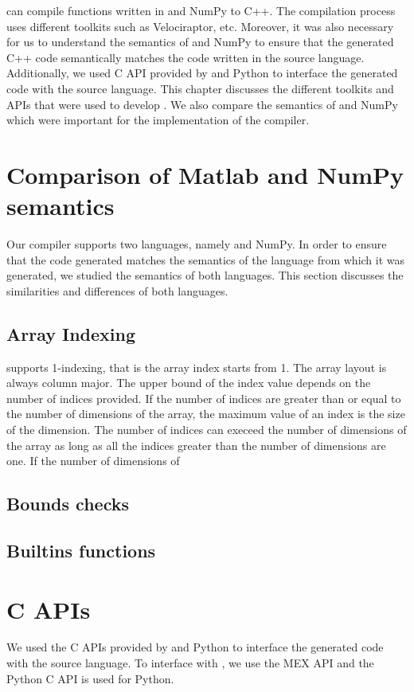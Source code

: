 \velocty can compile functions written in \matlab and NumPy to C++. The compilation process uses different toolkits such as Velociraptor, \mclab etc. Moreover, it was also necessary for us to understand the semantics of \matlab and NumPy to ensure that the generated C++ code semantically matches the code written in the source language. Additionally, we used C API provided by \matlab and Python to interface the generated code with the source language. This chapter discusses the different toolkits and APIs that were used to develop \velocty. We also compare the semantics of \matlab and NumPy which were important for the implementation of the compiler. 
\section{Comparison of Matlab and NumPy semantics}
Our compiler supports two languages, namely \matlab and NumPy. In order to ensure that the code generated matches the semantics of the language from which it was generated, we studied the semantics of both languages. This section discusses the similarities and differences of both languages. 
\subsection{Array Indexing}
\matlab supports 1-indexing, that is the array index starts from 1. 
The array layout is always column major. The upper bound of the index value depends on the number of indices provided. If the number of indices are greater than or equal to the number of dimensions of the array, the maximum value of an index is the size of the dimension. The number of indices can execeed the number of dimensions of the array as long as all the indices greater than the number of dimensions are one. If the number of dimensions of 
\subsection{Bounds checks}
\subsection{Builtins functions}
\section{C APIs}
We used the C APIs provided by \matlab and Python to interface the generated code with the source language. To interface with \matlab, we use the MEX\cite{mex} API and the Python C API is used for Python. 
